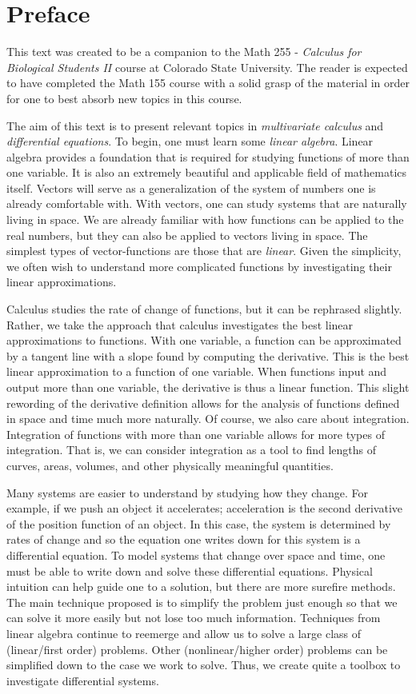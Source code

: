 \section*{Preface}

This text was created to be a companion to the Math 255 - \emph{Calculus for Biological Students II} course at Colorado State University.  The reader is expected to have completed the Math 155 course with a solid grasp of the material in order for one to best absorb new topics in this course.

The aim of this text is to present relevant topics in \emph{multivariate calculus} and \emph{differential equations}.  To begin, one must learn some \emph{linear algebra}. Linear algebra provides a foundation that is required for studying functions of more than one variable.  It is also an extremely beautiful and applicable field of mathematics itself.  Vectors will serve as a generalization of the system of numbers one is already comfortable with.  With vectors, one can study systems that are naturally living in space.  We are already familiar with how functions can be applied to the real numbers, but they can also be applied to vectors living in space.  The simplest types of vector-functions are those that are \emph{linear}.  Given the simplicity, we often wish to understand more complicated functions by investigating their linear approximations.

Calculus studies the rate of change of functions, but it can be rephrased slightly.  Rather, we take the approach that calculus investigates the best linear approximations to functions.  With one variable, a function can be approximated by a tangent line with a slope found by computing the derivative. This is the best linear approximation to a function of one variable.  When functions input and output more than one variable, the derivative is thus a linear function. This slight rewording of the derivative definition allows for the analysis of functions defined in space and time much more naturally.  Of course, we also care about integration. Integration of functions with more than one variable allows for more types of integration.  That is, we can consider integration as a tool to find lengths of curves, areas, volumes, and other physically meaningful quantities.  

Many systems are easier to understand by studying how they change.  For example, if we push an object it accelerates; acceleration is the second derivative of the position function of an object.  In this case, the system is determined by rates of change and so the equation one writes down for this system is a differential equation.  To model systems that change over space and time, one must be able to write down and solve these differential equations.  Physical intuition can help guide one to a solution, but there are more surefire methods.  The main technique proposed is to simplify the problem just enough so that we can solve it more easily but not lose too much information.  Techniques from linear algebra continue to reemerge and allow us to solve a large class of (linear/first order) problems.  Other (nonlinear/higher order) problems can be simplified down to the case we work to solve.  Thus, we create quite a toolbox to investigate differential systems.

